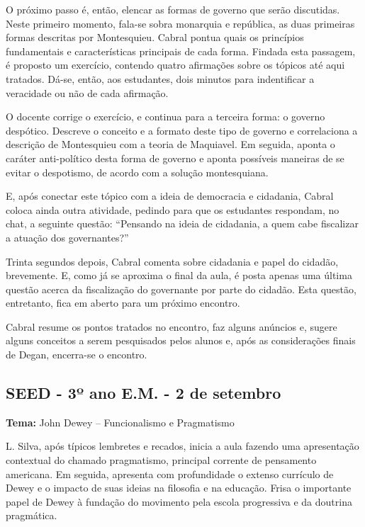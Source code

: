\documentclass[12pt,a4paper]{article}
\begin{document}
	O próximo passo é, então, elencar as formas de governo que serão 
	discutidas. Neste primeiro momento, fala-se sobra monarquia e 
	república, as duas primeiras formas descritas por Montesquieu. 
	Cabral pontua quais os princípios fundamentais e 
	características principais de cada forma. Findada esta passagem, 
	é proposto um exercício, contendo quatro afirmações sobre os 
	tópicos até aqui tratados. Dá-se, então, aos estudantes, dois 
	minutos para indentificar a veracidade ou não de cada afirmação. 

	O docente corrige o exercício, e continua para a terceira forma: 
	o governo despótico. Descreve o conceito e a formato deste tipo 
	de governo e correlaciona a descrição de Montesquieu com a teoria 
	de Maquiavel. Em seguida, aponta o caráter anti-político desta 
	forma de governo e aponta possíveis maneiras de se evitar o 
	despotismo, de acordo com a solução montesquiana. 

	E, após conectar este tópico com a ideia de democracia e cidadania, 
	Cabral coloca ainda outra atividade, pedindo para que os estudantes 
	respondam, no chat, a seguinte questão: “Pensando na ideia de 
	cidadania, a quem cabe fiscalizar a atuação dos governantes?” 

	Trinta segundos depois, Cabral comenta sobre cidadania e papel 
	do cidadão, brevemente. E, como já se aproxima o final da aula, 
	é posta apenas uma última questão acerca da fiscalização do 
	governante por parte do cidadão. Esta questão, entretanto, fica 
	em aberto para um próximo encontro. 

	Cabral resume os pontos tratados no encontro, faz alguns anúncios e, 
	sugere alguns conceitos a serem pesquisados pelos alunos e, 
	após as considerações finais de Degan, encerra-se o encontro. 

	\subsection{SEED - 3º ano E.M. - 2 de setembro}

	\textbf{Tema:} John Dewey -- Funcionalismo e Pragmatismo

	L. Silva, após típicos lembretes e recados, inicia a aula 
	fazendo uma apresentação contextual do chamado pragmatismo, 
	principal corrente de pensamento americana. Em seguida, 
	apresenta com profundidade o extenso currículo de Dewey e 
	o impacto de suas ideias na filosofia e na educação. Frisa 
	o importante papel de Dewey à fundação do movimento pela 
	escola progressiva e da doutrina pragmática. 
\end{document}
